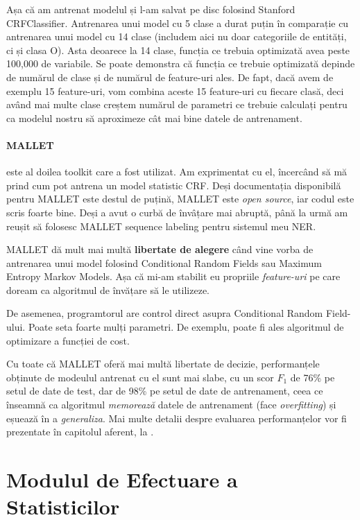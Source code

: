 Așa că am antrenat modelul și l-am salvat pe disc folosind Stanford CRFClassifier. Antrenarea unui model cu 5 clase a durat puțin în comparație cu antrenarea unui model cu 14 clase (includem aici nu doar categoriile de entități, ci și clasa O). Asta deoarece la 14 clase, funcția ce trebuia optimizată avea peste 100,000 de variabile. Se poate demonstra că funcția ce trebuie optimizată depinde de numărul de clase și de numărul de feature-uri ales. De fapt, dacă avem de exemplu 15 feature-uri, vom combina aceste 15 feature-uri  cu fiecare clasă, deci având mai multe clase creștem numărul de parametri ce trebuie calculați pentru ca modelul nostru să aproximeze cât mai bine datele de antrenament.

\paragraph{MALLET} este al doilea toolkit care a fost utilizat. Am exprimentat cu el, încercând să mă prind cum pot antrena un model statistic CRF. Deși documentația disponibilă pentru MALLET este destul de puțină, MALLET este \textit{open source}, iar codul este scris foarte bine. Deși a avut o curbă de învâțare mai abruptă, până la urmă am reușit să folosesc MALLET sequence labeling pentru sistemul meu NER. 

MALLET dă mult mai multă \textbf{libertate de alegere} când vine vorba de antrenarea unui model folosind Conditional Random Fields sau Maximum Entropy Markov Models. Așa că mi-am stabilit eu propriile \textit{feature-uri} pe care doream ca algoritmul de învățare să le utilizeze.

De asemenea, programtorul are control direct asupra Conditional Random Field-ului. Poate seta foarte mulți parametri. De exemplu, poate fi ales algoritmul de optimizare a funcției de cost.

Cu toate că MALLET oferă mai multă libertate de decizie, performanțele obținute de modeulul antrenat cu el sunt mai slabe, cu un scor $F_1$ de 76\% pe setul de date de test, dar de 98\% pe setul de date de antrenament, ceea ce înseamnă ca algoritmul \textit{memorează} datele de antrenament (face \textit{overfitting}) și eșuează în a \textit{generaliza}. Mai multe detalii despre evaluarea performanțelor vor fi prezentate în capitolul aferent, la .


\section{Modulul de Efectuare a Statisticilor}

